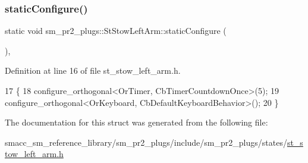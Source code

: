 \subsubsection{\texorpdfstring{static\+Configure()}{staticConfigure()}}
{\footnotesize\ttfamily static void sm\+\_\+pr2\+\_\+plugs\+::\+St\+Stow\+Left\+Arm\+::static\+Configure (\begin{DoxyParamCaption}{ }\end{DoxyParamCaption})\hspace{0.3cm}{\ttfamily [inline]}, {\ttfamily [static]}}



Definition at line 16 of file st\+\_\+stow\+\_\+left\+\_\+arm.\+h.


\begin{DoxyCode}
17     \{
18         configure\_orthogonal<OrTimer,  CbTimerCountdownOnce>(5);    
19         configure\_orthogonal<OrKeyboard, CbDefaultKeyboardBehavior>();
20     \}
\end{DoxyCode}


The documentation for this struct was generated from the following file\+:\begin{DoxyCompactItemize}
\item 
smacc\+\_\+sm\+\_\+reference\+\_\+library/sm\+\_\+pr2\+\_\+plugs/include/sm\+\_\+pr2\+\_\+plugs/states/\hyperlink{st__stow__left__arm_8h}{st\+\_\+stow\+\_\+left\+\_\+arm.\+h}\end{DoxyCompactItemize}
